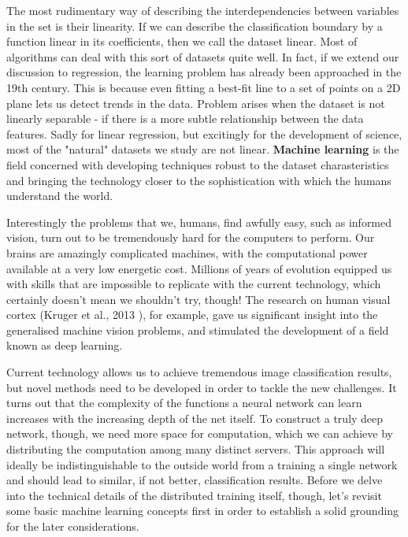 \documentclass[a4paper, 11pt]{article}
\numberwithin{equation}{section}
\begin{document}
	The most rudimentary way of describing the interdependencies between variables in the set is their linearity. If we can describe the classification boundary by a function linear in its coefficients, then we call the dataset linear. Most of algorithms can deal with this sort of datasets quite well. In fact, if we extend our discussion to regression, the learning problem has already been approached in the 19th century. This is because even fitting a best-fit line to a set of points on a 2D plane lets us detect trends in the data. Problem arises when the dataset is not linearly separable - if there is a more subtle relationship between the data features. Sadly for linear regression, but excitingly for the development of science, most of the "natural" datasets we study are not linear. \textbf{Machine learning} is the field concerned with developing techniques robust to the dataset charasteristics and bringing the technology closer to the sophistication with which the humans understand the world.
	
	Interestingly the problems that we, humans, find awfully easy, such as informed vision, turn out to be tremendously hard for the computers to perform. Our brains are amazingly complicated machines, with the computational power available at a very low energetic cost. Millions of years of evolution equipped us with skills that are impossible to replicate with the current technology, which certainly doesn't mean we shouldn't try, though! The research on human visual cortex (Kruger et al., 2013 \cite{kruger2013deep}), for example, gave us significant insight into the generalised machine vision problems, and stimulated the development of a field known as deep learning.
	
	Current technology allows us to achieve tremendous image classification results, but novel methods need to be developed in order to tackle the new challenges. It turns out that the complexity of the functions a neural network can learn increases with the increasing depth of the net itself. To construct a truly deep network, though, we need more space for computation, which we can achieve by distributing the computation among many distinct servers. This approach will ideally be indistinguishable to the outside world from a training a single network and should lead to similar, if not better, classification results. Before we delve into the technical details of the distributed training itself, though, let's revisit some basic machine learning concepts first in order to establish a solid grounding for the later considerations.
	
\end{document}
